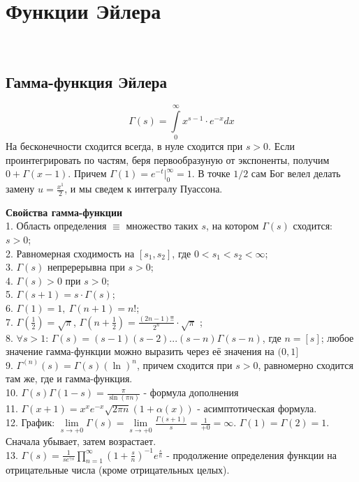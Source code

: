 \section{Функции Эйлера}\
\subsection{Гамма-функция Эйлера}
$$\Gamma(s)=\int\limits_{0}^{\infty}x^{s-1}\cdot e^{-x}dx$$
На бесконечности сходится всегда, в нуле сходится при $s>0$.
Если проинтегрировать по частям, беря первообразуную от экспоненты, 
получим  $0+\Gamma(x-1)$. Причем $\Gamma(1)=e^{-t}\Big|_0^\infty=1$.
В точке $1/2$ сам Бог велел делать замену  $u=\frac{x^1}{2}$, и мы 
сведем к интегралу Пуассона. 

\textbf{Свойства гамма-функции}\\
1. Область определения $\equiv$ множество таких $s$, на котором 
$\Gamma(s)$ сходится:  $s>0$;\\
2. Равномерная сходимость на $[s_1,s_2]$, где $0<s_1<s_2<\infty$;\\
3. $\Gamma(s)$ непререрывна при  $s>0$;\\
4.  $\Gamma(s)>0$ при  $s>0$;\\
5.  $\boxed{\Gamma(s+1)=s\cdot \Gamma(s)}$;\\
6. $\Gamma(1)=1,~\Gamma(n+1)=n!$;\\
7.  $\Gamma\left( \frac{1}{2} \right)=\sqrt{\pi}$, $\Gamma\left( 
n+\frac{1}{2}\right)=\frac{(2n-1)!!}{2^n}\cdot \sqrt{\pi}$ ;\\
8. $\forall s>1$: $\Gamma(s)=(s-1)(s-2)...(s-n)\Gamma(s-n)$, где  $n=[s]$; 
любое значение гамма-функции можно выразить через её значения на $(0,1]$\\
9. $\Gamma^{(n)}(s)=\Gamma(s)(\ln)^n$, причем сходится при $s>0$, равномерно
сходится там же, где и гамма-функция.\\
10. $\Gamma(s)\Gamma(1-s)=\frac{\pi}{\sin(\pi n)}$ - формула дополнения\\
11. $\Gamma(x+1)=x^xe^{-x}\sqrt{2\pi n}(1+\alpha(x))$ - асимптотическая 
формула.\\
12. График: $\lim\limits_{s \to +0} \Gamma(s)=
\lim\limits_{s \to +0} \frac{\Gamma(s+1)}{s}=\frac{1}{+0}=\infty$.
$\Gamma(1)=\Gamma(2)=1$. Сначала убывает, затем возрастает.\\
13. $\Gamma(s)=\frac{1}{se^{\gamma s}}\prod\limits_{n=1}^{\infty}
\left( 1+\frac{s}{n} \right)^{-1}e^{\frac{s}{n}}$ - продолжение определения
функции на отрицательные числа (кроме отрицательных целых). 

